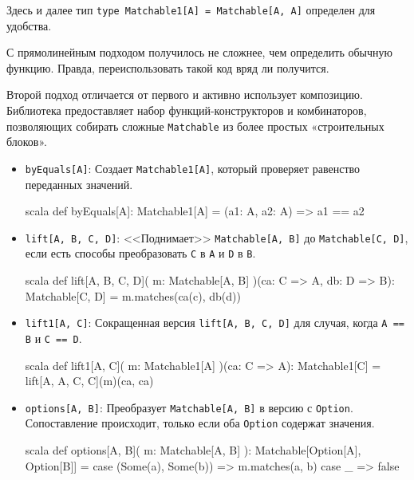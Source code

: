 Здесь и далее тип \verb|type Matchable1[A] = Matchable[A, A]| определен для удобства. 

С прямолинейным подходом получилось не сложнее, чем определить обычную функцию. Правда, переиспользовать такой код вряд ли получится. 

Второй подход отличается от первого и активно использует композицию. Библиотека предоставляет набор функций-конструкторов и комбинаторов, позволяющих собирать сложные \verb|Matchable| из более простых «строительных блоков».

\begin{itemize}
    \item \verb|byEquals[A]|: Создает \verb|Matchable1[A]|, который проверяет равенство переданных значений.    

\begin{codenl}{scala}
def byEquals[A]: Matchable1[A] =
  (a1: A, a2: A) => a1 == a2
\end{codenl}

    \item \verb|lift[A, B, C, D]|: <<Поднимает>> \verb|Matchable[A, B]| до \verb|Matchable[C, D]|, если есть способы преобразовать \verb|C| в \verb|A| и \verb|D| в \verb|B|.

\begin{codenl}{scala}
def lift[A, B, C, D](
    m: Matchable[A, B]
  )(ca: C => A, 
    db: D => B): Matchable[C, D] = 
  m.matches(ca(c), db(d))
\end{codenl}

    \item \verb|lift1[A, C]|: Сокращенная версия \verb|lift[A, B, C, D]| для случая, когда \verb|A == B| и \verb|C == D|.

\begin{codenl}{scala}
def lift1[A, C](
    m: Matchable1[A]
  )(ca: C => A): Matchable1[C] =
  lift[A, A, C, C](m)(ca, ca)
\end{codenl}

    \item \verb|options[A, B]|: Преобразует \verb|Matchable[A, B]| в версию с \verb|Option|. Сопоставление происходит, только если оба \verb|Option| содержат значения.

\begin{codenl}{scala}
def options[A, B](
    m: Matchable[A, B]
  ): Matchable[Option[A], Option[B]] = {
  case (Some(a), Some(b)) => m.matches(a, b)
  case _ => false
}
\end{codenl}

\end{itemize}


